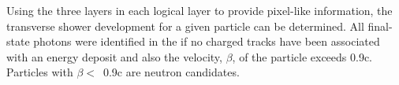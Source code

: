 Using the three layers in each logical layer to provide pixel-like information, the transverse shower development for a given particle can be determined. All final-state photons were identified in the  if no charged tracks have been associated with an energy deposit and also the velocity, $\beta$, of the particle exceeds 0.9c. Particles with $\beta <$~0.9c are neutron candidates.
